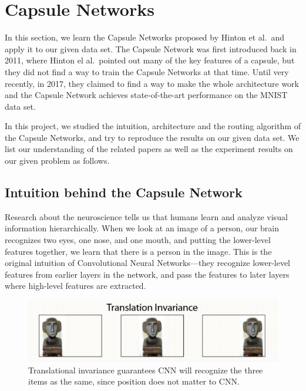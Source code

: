 \documentclass{article}
\begin{document}
\section{Capsule Networks}
In this section, we learn the Capsule Networks proposed by Hinton et al.\ and apply it to our given data set. The Capsule Network was first introduced back in 2011\cite{hinton2011transforming}, where Hinton el al.\ pointed out many of the key features of a capsule, but they did not find a way to train the Capsule Networks at that time. Until very recently, in 2017, they claimed to find a way to make the whole architecture work and the Capsule Network achieves state-of-the-art performance on the MNIST data set\cite{sabour2017dynamic}. 

In this project, we studied the intuition, architecture and the routing algorithm of the Capsule Networks, and try to reproduce the results on our given data set. We list our understanding of the related papers as well as the experiment results on our given problem as follows.

\subsection{Intuition behind the Capsule Network}
Research about the neuroscience tells us that humans learn and analyze visual information hierarchically. When we look at an image of a person, our brain recognizes two eyes, one nose, and one mouth, and putting the lower-level features together, we learn that there is a person in the image. This is the original intuition of Convolutional Neural Networks---they recognize lower-level features from earlier layers in the network, and pass the features to later layers where high-level features are extracted. 

\begin{figure}[!htb]
	\centering\includegraphics[width=1.0\textwidth]{fig//invariance}
	\caption{Translational invariance guarantees CNN will recognize the three items as the same, since position does not matter to CNN.\protect\footnotemark }\label{fig:invariance}
\end{figure}
\end{document}
